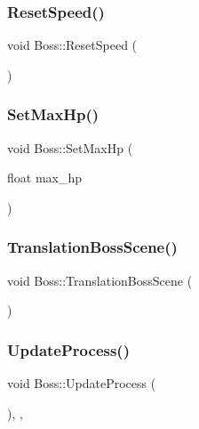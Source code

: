 \subsubsection{\texorpdfstring{Reset\+Speed()}{ResetSpeed()}}
{\footnotesize\ttfamily void Boss\+::\+Reset\+Speed (\begin{DoxyParamCaption}{ }\end{DoxyParamCaption})\hspace{0.3cm}{\ttfamily [inline]}}

\mbox{\label{class_boss_a3085cbf44a8e918abac0a62a6e443cab}} 
\subsubsection{\texorpdfstring{Set\+Max\+Hp()}{SetMaxHp()}}
{\footnotesize\ttfamily void Boss\+::\+Set\+Max\+Hp (\begin{DoxyParamCaption}\item[{float}]{max\+\_\+hp }\end{DoxyParamCaption})\hspace{0.3cm}{\ttfamily [inline]}}

\mbox{\label{class_boss_a2d13fa10c0820f4131c145b6496a5e0b}} 
\subsubsection{\texorpdfstring{Translation\+Boss\+Scene()}{TranslationBossScene()}}
{\footnotesize\ttfamily void Boss\+::\+Translation\+Boss\+Scene (\begin{DoxyParamCaption}{ }\end{DoxyParamCaption})\hspace{0.3cm}{\ttfamily [inline]}}

\mbox{\label{class_boss_a12b3970fee863198d6dafb9bafc55d47}} 
\subsubsection{\texorpdfstring{Update\+Process()}{UpdateProcess()}}
{\footnotesize\ttfamily void Boss\+::\+Update\+Process (\begin{DoxyParamCaption}{ }\end{DoxyParamCaption})\hspace{0.3cm}{\ttfamily [final]}, {\ttfamily [protected]}, {\ttfamily [virtual]}}



